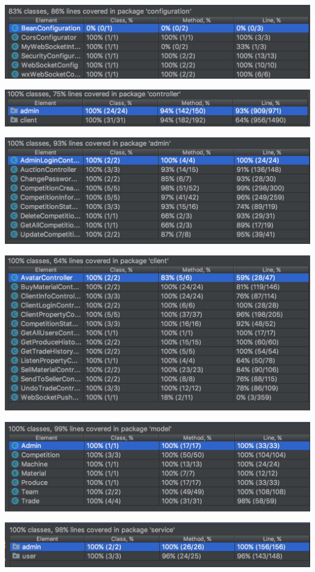 \documentclass{article}
\begin{document}
			\includegraphics[scale = .3]{fig/test_2.jpg}
		
			\includegraphics[scale = .3]{fig/test_3.jpg}
		
			\includegraphics[scale = .3]{fig/test_4.jpg}
		
			\includegraphics[scale = .3]{fig/test_5.jpg}
		
			\includegraphics[scale = .3]{fig/test_6.jpg}
		
			\includegraphics[scale = .3]{fig/test_7.jpg}
		
\end{document}
